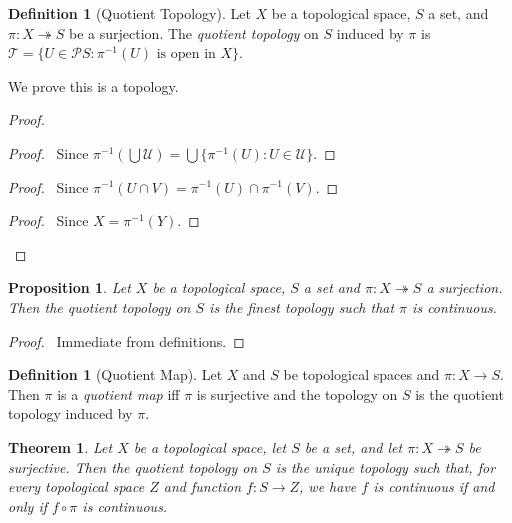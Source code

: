 \documentclass{book}
\let\qed\relax
\newtheorem{prop}[ax]{Proposition}
\newtheorem{thm}[ax]{Theorem}
\theoremstyle{definition}
\newtheorem{df}[ax]{Definition}
\newcommand{\inv}[1]{\ensuremath{{#1}^{-1}}}
\begin{document}
\begin{df}[Quotient Topology]
Let $X$ be a topological space, $S$ a set, and $\pi : X \twoheadrightarrow S$ be a surjection. The \emph{quotient topology} on $S$ induced by $\pi$ is $\mathcal{T} = \{ U \in \mathcal{P} S : \inv{\pi}(U) \text{ is open in } X \}$.

We prove this is a topology.
\end{df}

\begin{proof}
\pf
{}
\begin{proof}
	\pf\ Since $\inv{\pi}(\bigcup \mathcal{U}) = \bigcup \{ \inv{\pi}(U) : U \in \mathcal{U} \}$.
\end{proof}
\begin{proof}
	\pf\ Since $\inv{\pi}(U \cap V) = \inv{\pi}(U) \cap \inv{\pi}(V)$.
\end{proof}
\begin{proof}
	\pf\ Since $X = \inv{\pi}(Y)$.
\end{proof}
\qed
\end{proof}

\begin{prop}
Let $X$ be a topological space, $S$ a set and $\pi : X \twoheadrightarrow S$ a surjection. Then the quotient topology on $S$ is the finest topology such that $\pi$ is continuous.
\end{prop}

\begin{proof}
\pf\ Immediate from definitions. \qed
\end{proof}

\begin{df}[Quotient Map]
Let $X$ and $S$ be topological spaces and $\pi : X \rightarrow S$. Then $\pi$ is a \emph{quotient map} iff $\pi$ is surjective and the topology on $S$ is the quotient topology induced by $\pi$.
\end{df}

\begin{thm}
Let $X$ be a topological space, let $S$ be a set, and let $\pi : X \twoheadrightarrow S$ be surjective. Then the quotient topology on $S$ is the unique topology such that, for every topological space $Z$ and function $f : S \rightarrow Z$, we have $f$ is continuous if and only if $f \circ \pi$ is continuous.
\end{thm}
\end{document}
